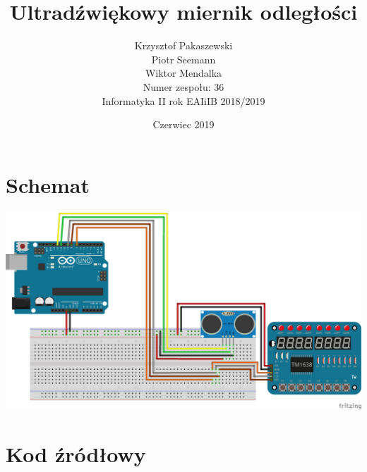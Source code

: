 \documentclass{article}
\title{Ultradźwiękowy miernik odległości}
\author{Krzysztof Pakaszewski\\Piotr Seemann\\Wiktor Mendalka\\Numer zespołu: 36\\Informatyka II rok EAIiIB 2018/2019}
\date{Czerwiec 2019}
\begin{document}
\maketitle

\section{Schemat}
\includegraphics[scale=0.5]{sketch_bb.png}

\section{Kod źródłowy}

\end{document}
